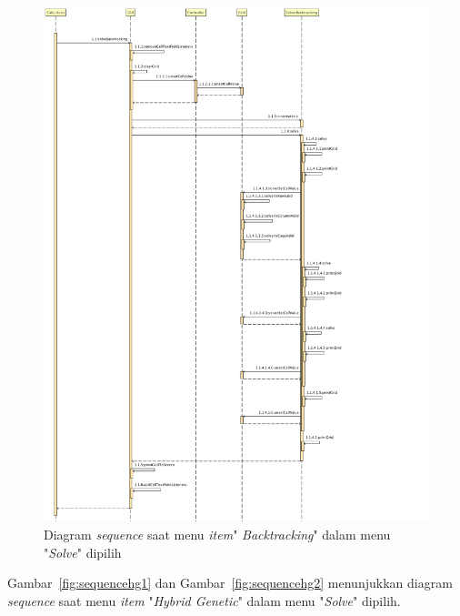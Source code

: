 \begin{figure}
\centering
\captionsetup{justification=centering}
\includegraphics[scale=0.375]{Gambar/Analisis/SequenceDiagramBacktracking.png}
\caption[Diagram \textit{sequence} saat menu \textit{item}" \textit{Backtracking}" dalam menu "\textit{Solve}" dipilih]{Diagram \textit{sequence} saat menu \textit{item}" \textit{Backtracking}" dalam menu "\textit{Solve}" dipilih}
\label{fig:sequencebt}
\end{figure}

Gambar~\ref{fig:sequencehg1} dan Gambar~\ref{fig:sequencehg2} menunjukkan diagram \textit{sequence} saat menu \textit{item} "\textit{Hybrid Genetic}" dalam menu "\textit{Solve}" dipilih.

